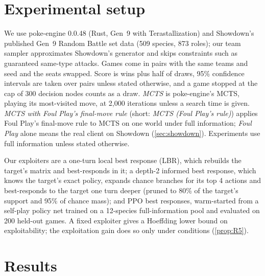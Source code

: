 \documentclass[10pt]{article}
\theoremstyle{plain}
\theoremstyle{definition}
\theoremstyle{remark}
\begin{document}
\section{Experimental setup}
\label{sec:setup}
We use poke-engine 0.0.48 (Rust, Gen~9 with Terastallization) and Showdown's published Gen~9 Random Battle set data (509 species, 873 roles); our team sampler approximates Showdown's generator and skips constraints such as guaranteed same-type attacks. Games come in pairs with the same teams and seed and the seats swapped. Score is wins plus half of draws, 95\% confidence intervals are taken over pairs unless stated otherwise, and a game stopped at the cap of 300 decision nodes counts as a draw. \emph{MCTS} is poke-engine's MCTS, playing its most-visited move, at 2,000 iterations unless a search time is given. \emph{MCTS with Foul Play's final-move rule} (short: \emph{MCTS (Foul Play's rule)}) applies Foul Play's final-move rule to MCTS on one world under full information; \emph{Foul Play} alone means the real client on Showdown (\cref{sec:showdown}). Experiments use full information unless stated otherwise.

Our exploiters are a one-turn local best response (LBR), which rebuilds the target's matrix and best-responds in it; a depth-2 informed best response, which knows the target's exact policy, expands chance branches for its top 4 actions and best-responds to the target one turn deeper (pruned to 80\% of the target's support and 95\% of chance mass); and PPO best responses, warm-started from a self-play policy net trained on a 12-species full-information pool and evaluated on 200 held-out games. A fixed exploiter gives a Hoeffding lower bound on exploitability; the exploitation gain does so only under conditions (\cref{prop:R5}).

\section{Results}
\label{sec:exp}
\end{document}
